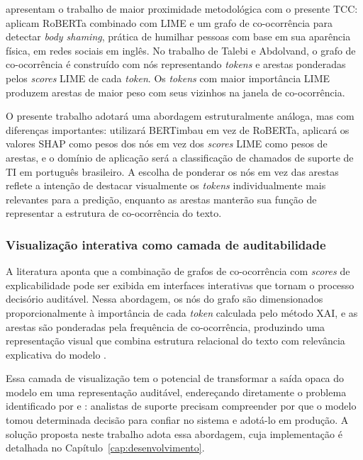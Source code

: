 \documentclass[
    12pt,                %
    openright,           %
    oneside,             %
    a4paper,             %
    english,             %
    brazil               %
]{abntex2}
\begin{document}
 apresentam o trabalho de maior proximidade 
metodológica com o presente TCC: aplicam RoBERTa combinado com LIME 
e um grafo de co-ocorrência para detectar \textit{body shaming}, 
prática de humilhar pessoas com base em sua aparência física, em 
redes sociais em inglês. No trabalho de Talebi e Abdolvand, o grafo 
de co-ocorrência é construído com nós representando \textit{tokens} 
e arestas ponderadas pelos \textit{scores} LIME de cada \textit{token}. 
Os \textit{tokens} com maior importância LIME produzem arestas de 
maior peso com seus vizinhos na janela de co-ocorrência.

O presente trabalho adotará uma abordagem estruturalmente análoga, 
mas com diferenças importantes: utilizará BERTimbau em vez de 
RoBERTa, aplicará os valores SHAP como pesos dos nós em vez dos 
\textit{scores} LIME como pesos de arestas, e o domínio de aplicação 
será a classificação de chamados de suporte de TI em português 
brasileiro. A escolha de ponderar os nós em vez das arestas reflete 
a intenção de destacar visualmente os \textit{tokens} individualmente 
mais relevantes para a predição, enquanto as arestas manterão sua 
função de representar a estrutura de co-ocorrência do texto.

\subsubsection{Visualização interativa como camada de auditabilidade}
\label{subsubsec:grafo_xai_visualizacao}

A literatura aponta que a combinação de grafos de co-ocorrência com \textit{scores} de explicabilidade pode ser exibida em interfaces interativas 
que tornam o processo decisório auditável. Nessa abordagem, os nós 
do grafo são dimensionados proporcionalmente à importância de cada 
\textit{token} calculada pelo método XAI, e as arestas são ponderadas 
pela frequência de co-ocorrência, produzindo uma representação visual 
que combina estrutura relacional do texto com relevância explicativa 
do modelo \cite{talebi2025}.

Essa camada de visualização tem o potencial de transformar a saída 
opaca do modelo em uma representação auditável, endereçando diretamente 
o problema identificado por  e 
: analistas de suporte precisam compreender por 
que o modelo tomou determinada decisão para confiar no sistema e 
adotá-lo em produção. A solução proposta neste trabalho adota essa 
abordagem, cuja implementação é detalhada no Capítulo~\ref{cap:desenvolvimento}.
\end{document}
